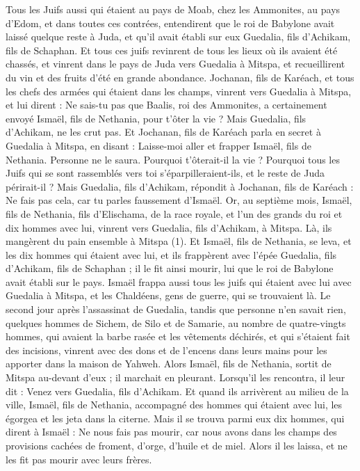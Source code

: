 \begin{multicols}{2}
Tous les Juifs aussi qui étaient au pays de Moab, chez les Ammonites, au pays d’Edom, et dans toutes ces contrées, entendirent que le roi de Babylone avait laissé quelque reste à Juda, et qu'il avait établi sur eux Guedalia, fils d'Achikam, fils de Schaphan.
Et tous ces juifs revinrent de tous les lieux où ils avaient été chassés, et vinrent dans le pays de Juda vers Guedalia à Mitspa, et recueillirent du vin et des fruits d’été en grande abondance.
Jochanan, fils de Karéach, et tous les chefs des armées qui étaient dans les champs, vinrent vers Guedalia à Mitspa,
et lui dirent : Ne sais-tu pas que Baalis, roi des Ammonites, a certainement envoyé Ismaël, fils de Nethania, pour t'ôter la vie ? Mais Guedalia, fils d'Achikam, ne les crut pas.
Et Jochanan, fils de Karéach parla en secret à Guedalia à Mitspa, en disant : Laisse-moi aller et frapper Ismaël, fils de Nethania. Personne ne le saura. Pourquoi t'ôterait-il la vie ? Pourquoi tous les Juifs qui se sont rassemblés vers toi s’éparpilleraient-ils, et le reste de Juda périrait-il ?
Mais Guedalia, fils d'Achikam, répondit à Jochanan, fils de Karéach : Ne fais pas cela, car tu parles faussement d'Ismaël.
\VerseOne{}Or, au septième mois, Ismaël, fils de Nethania, fils d'Elischama, de la race royale, et l'un des grands du roi et dix hommes avec lui, vinrent vers Guedalia, fils d'Achikam, à Mitspa. Là, ils mangèrent du pain ensemble à Mitspa\FTNT{} (1).
Et Ismaël, fils de Nethania, se leva, et les dix hommes qui étaient avec lui, et ils frappèrent avec l'épée Guedalia, fils d'Achikam, fils de Schaphan ; il le fit ainsi mourir, lui que le roi de Babylone avait établi sur le pays.
Ismaël frappa aussi tous les juifs qui étaient avec lui avec Guedalia à Mitspa, et les Chaldéens, gens de guerre, qui se trouvaient là.
Le second jour après l’assassinat de Guedalia, tandis que personne n’en savait rien,
quelques hommes de Sichem, de Silo et de Samarie, au nombre de quatre-vingts hommes, qui avaient la barbe rasée et les vêtements déchirés, et qui s'étaient fait des incisions, vinrent avec des dons et de l'encens dans leurs mains pour les apporter dans la maison de Yahweh.
Alors Ismaël, fils de Nethania, sortit de Mitspa au-devant d'eux ; il marchait en pleurant. Lorsqu’il les rencontra, il leur dit : Venez vers Guedalia, fils d'Achikam.
Et quand ils arrivèrent au milieu de la ville, Ismaël, fils de Nethania, accompagné des hommes qui étaient avec lui, les égorgea et les jeta dans la citerne.
Mais il se trouva parmi eux dix hommes, qui dirent à Ismaël : Ne nous fais pas mourir, car nous avons dans les champs des provisions cachées de froment, d'orge, d'huile et de miel. Alors il les laissa, et ne les fit pas mourir avec leurs frères.

\end{multicols}
